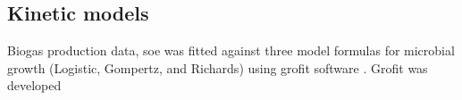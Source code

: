 \subsection{Kinetic models}
Biogas production data, soe was fitted against three model formulas for microbial growth (Logistic, Gompertz, and Richards) using grofit software \cite{Kahm_2010}. Grofit was developed 